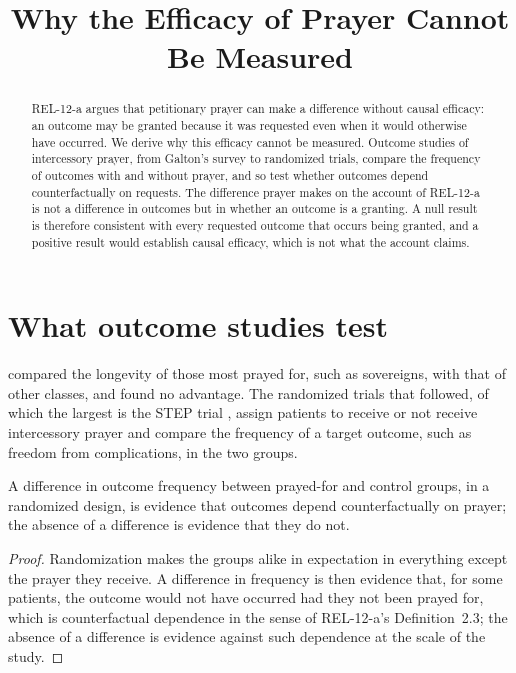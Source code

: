 \documentclass{situationist-preprint}
\title{Why the Efficacy of Prayer Cannot Be Measured}
\begin{document}
\maketitle

\begin{abstract}
REL-12-a argues that petitionary prayer can make a difference without causal efficacy: an outcome may be granted because it was requested even when it would otherwise have occurred. We derive why this efficacy cannot be measured. Outcome studies of intercessory prayer, from Galton's survey to randomized trials, compare the frequency of outcomes with and without prayer, and so test whether outcomes depend counterfactually on requests. The difference prayer makes on the account of REL-12-a is not a difference in outcomes but in whether an outcome is a granting. A null result is therefore consistent with every requested outcome that occurs being granted, and a positive result would establish causal efficacy, which is not what the account claims.
\end{abstract}

\section{What outcome studies test}

\citet{Galton1872} compared the longevity of those most prayed for, such as sovereigns, with that of other classes, and found no advantage. The randomized trials that followed, of which the largest is the STEP trial \citep{Benson2006}, assign patients to receive or not receive intercessory prayer and compare the frequency of a target outcome, such as freedom from complications, in the two groups.

\begin{proposition}\label{p:test}
A difference in outcome frequency between prayed-for and control groups, in a randomized design, is evidence that outcomes depend counterfactually on prayer; the absence of a difference is evidence that they do not.
\end{proposition}

\begin{proof}
Randomization makes the groups alike in expectation in everything except the prayer they receive. A difference in frequency is then evidence that, for some patients, the outcome would not have occurred had they not been prayed for, which is counterfactual dependence in the sense of REL-12-a's Definition~2.3; the absence of a difference is evidence against such dependence at the scale of the study.
\end{proof}
\end{document}
